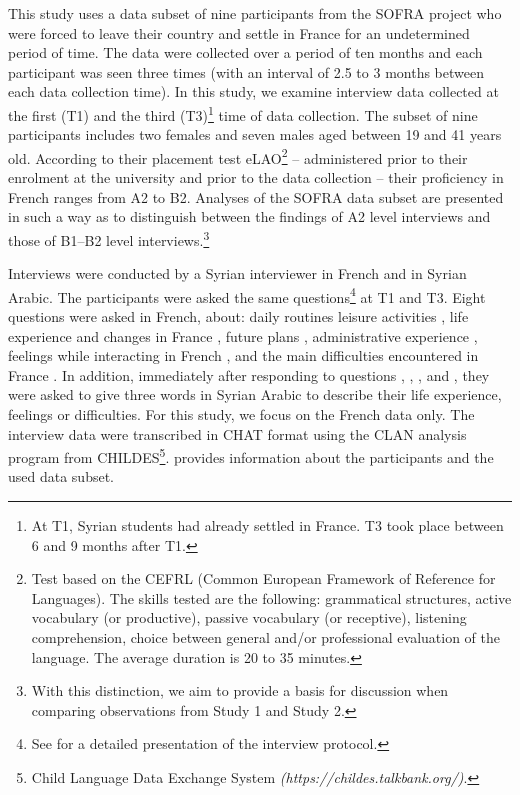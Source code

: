 \documentclass[output=paper]{langscibook}
\begin{document}
This study uses a data subset of nine participants from the SOFRA project who were forced to leave their country and settle in France for an undetermined period of time. The data were collected over a period of ten months and each participant was seen three times (with an interval of 2.5 to 3 months between each data collection time). In this study, we examine interview data collected at the first (T1) and the third (T3)\footnote{At T1, Syrian students had already settled in France. T3 took place between 6 and 9 months after T1.}  time of data collection. The subset of nine participants includes two females and seven males aged between 19 and 41 years old. According to their placement test eLAO\footnote{Test based on the CEFRL (Common European Framework of Reference for Languages). The skills tested are the following: grammatical structures, active vocabulary (or productive), passive vocabulary (or receptive), listening comprehension, choice between general and/or professional evaluation of the language. The average duration is 20 to 35 minutes.} – administered prior to their enrolment at the university and prior to the data collection – their proficiency in French ranges from A2 to B2. Analyses of the SOFRA data subset are presented in such a way as to distinguish between the findings of A2 level interviews and those of B1–B2 level interviews.\footnote{With this distinction, we aim to provide a basis for discussion when comparing observations from Study 1 and Study 2.}

Interviews were conducted by a Syrian interviewer in French and in Syrian Arabic. The participants were asked the same questions\footnote{See \citet{Saddour2020} for a detailed presentation of the interview protocol.} at T1 and T3. Eight questions were asked in French, about:  daily routines  leisure activities , life experience  and changes in France , future plans , administrative experience , feelings while interacting in French , and the main difficulties encountered in France . In addition, immediately after responding to questions , , ,  and , they were asked to give three words in Syrian Arabic to describe their life experience, feelings or difficulties. For this study, we focus on the French data only. The interview data were transcribed in CHAT format using the CLAN analysis program from CHILDES\footnote{Child Language Data Exchange System \textit{(https://childes.talkbank.org/)}.}.  provides information about the participants and the used data subset.
\end{document}
